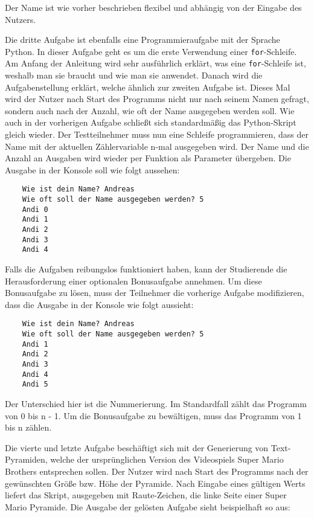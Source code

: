 Der Name ist wie vorher beschrieben flexibel und abhängig von der Eingabe des
Nutzers.

Die dritte Aufgabe ist ebenfalls eine Programmieraufgabe mit der
Sprache Python. In dieser Aufgabe geht es um die erste Verwendung einer
\texttt{for}-Schleife. Am Anfang der Anleitung wird sehr ausführlich erklärt,
was eine \texttt{for}-Schleife ist, weshalb man sie braucht und wie man sie
anwendet. Danach wird die Aufgabenstellung erklärt, welche ähnlich zur zweiten
Aufgabe ist. Dieses Mal wird der Nutzer nach Start des Programms nicht nur nach
seinem Namen gefragt, sondern auch nach der Anzahl, wie oft der Name ausgegeben
werden soll. Wie auch in der vorherigen Aufgabe schließt sich standardmäßig das
Python-Skript gleich wieder. Der Testteilnehmer muss nun eine Schleife
programmieren, dass der Name mit der aktuellen Zählervariable n-mal ausgegeben
wird. Der Name und die Anzahl an Ausgaben wird wieder per Funktion als Parameter
übergeben. Die Ausgabe in der Konsole soll wie folgt aussehen:

\begin{lstlisting}
    Wie ist dein Name? Andreas
    Wie oft soll der Name ausgegeben werden? 5
    Andi 0
    Andi 1
    Andi 2
    Andi 3
    Andi 4
\end{lstlisting}

Falls die Aufgaben reibungslos funktioniert haben, kann der Studierende
die Herausforderung einer optionalen Bonusaufgabe annehmen. Um diese
Bonusaufgabe zu lösen, muss der Teilnehmer die vorherige Aufgabe modifizieren,
dass die Ausgabe in der Konsole wie folgt aussieht:

\begin{lstlisting}
    Wie ist dein Name? Andreas
    Wie oft soll der Name ausgegeben werden? 5
    Andi 1
    Andi 2
    Andi 3
    Andi 4
    Andi 5
\end{lstlisting}

Der Unterschied hier ist die Nummerierung. Im Standardfall zählt das Programm
von 0 bis n - 1. Um die Bonusaufgabe zu bewältigen, muss das Programm von 1 bis n
zählen.

Die vierte und letzte Aufgabe beschäftigt sich mit der Generierung von
Text-Pyramiden, welche der ursprünglichen Version des Videospiels Super Mario
Brothers entsprechen sollen. Der Nutzer wird nach Start des Programms nach der gewünschten Größe bzw. Höhe der Pyramide. Nach Eingabe eines gültigen Werts
liefert das Skript, ausgegeben mit Raute-Zeichen, die linke Seite einer Super
Mario Pyramide. Die Ausgabe der gelösten Aufgabe sieht beispielhaft so aus:

